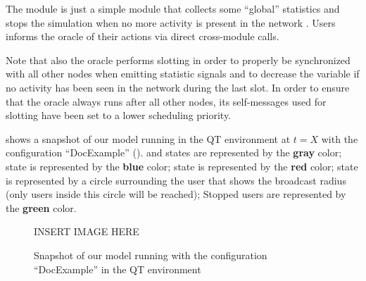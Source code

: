 The  module is just a simple module that collects some ``global''
statistics and stops the simulation when no more activity is present in the
network . Users informs the oracle of
their actions via direct cross-module calls.

Note that also the oracle performs slotting in order to properly be synchronized
with all other nodes when emitting statistic signals and to decrease the
 variable if no activity has been seen in the network during the
last slot. In order to ensure that the oracle always runs after all other nodes,
its self-messages used for slotting have been set to a lower scheduling
priority.

 shows a snapshot of our model running in the \omnetpp{} QT
environment at \(t = X\) with the configuration ``DocExample''
().  and  states are represented by
the \textcolor{idle}{\textbf{gray}} color;  state is represented
by the \textcolor{hearing}{\textbf{blue}} color;  state is
represented by the \textcolor{collision}{\textbf{red}} color; 
state is represented by a circle surrounding the user that shows the broadcast
radius (only users inside this circle will be reached); Stopped users are
represented by the \textcolor{relayed}{\textbf{green}} color.

\begin{figure}[htb]
	\centering
	INSERT IMAGE HERE
	\caption{Snapshot of our model running with the configuration
	``DocExample'' in the \omnetpp{} QT environment}\label{fig:snapshot}
\end{figure}
